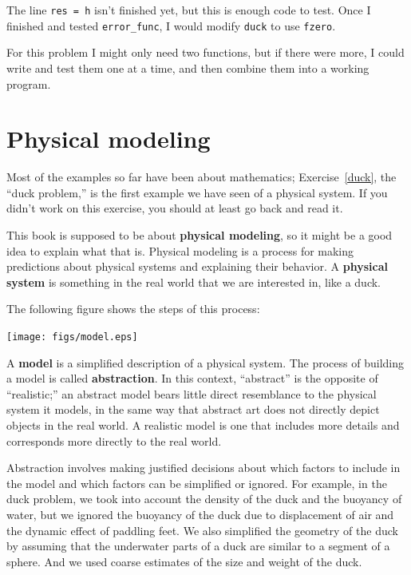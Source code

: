 \documentclass{book}
\begin{document}
The line {\tt res = h} isn't finished yet, but this
is enough code to test.
Once I finished and tested {\tt error\_func}, I would modify
{\tt duck} to use {\tt fzero}.

For this problem I might only need two functions, but if there
were more, I could write and test them one at a time, and then
combine them into a working program.



\section{Physical modeling}
\label{modeling}

Most of the examples so far have been about mathematics;
Exercise~\ref{duck}, the ``duck problem,'' is the first example we
have seen of a physical system. If you didn't work on this exercise,
you should at least go back and read it.

This book is supposed to be about {\bf physical modeling}, so it might
be a good idea to explain what that is. Physical modeling is a process
for making predictions about physical systems and explaining their
behavior. A {\bf physical system} is something in the real
world that we are interested in, like a duck.

The following figure shows the steps of this process:

\beforefig \centerline{\texttt{[image: figs/model.eps]}}

A {\bf model} is a simplified description of a physical system. The
process of building a model is called {\bf abstraction}. In this
context, ``abstract'' is the opposite of ``realistic;'' an abstract
model bears little direct resemblance to the physical system it
models, in the same way that abstract art does not directly depict
objects in the real world. A realistic model is one that includes
more details and corresponds more directly to the real world.

Abstraction involves making justified decisions about which factors to
include in the model and which factors can be simplified or ignored.
For example, in the duck problem, we took into account the density of
the duck and the buoyancy of water, but we ignored the buoyancy of the
duck due to displacement of air and the dynamic effect of paddling
feet. We also simplified the geometry of the duck by assuming that
the underwater parts of a duck are similar to a segment of a sphere.
And we used coarse estimates of the size and weight of the duck.
\end{document}
